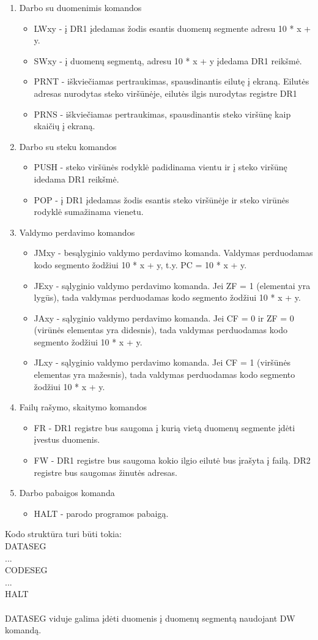 \begin{enumerate}
\begin{itemize}
		\end{itemize}
	\item Darbo su duomenimis komandos
		\begin{itemize}
		\item LWxy - į DR1 įdedamas žodis esantis duomenų segmente adresu 10 * x + y.
		\item SWxy - į duomenų segmentą, adresu 10 * x + y įdedama DR1 reikšmė.
		\item PRNT - iškviečiamas pertraukimas, spausdinantis eilutę į ekraną. Eilutės adresas nurodytas steko viršūnėje, eilutės ilgis nurodytas registre DR1
		\item PRNS - iškviečiamas pertraukimas, spausdinantis steko viršūnę kaip skaičių į ekraną.
		\end{itemize}
	\item Darbo su steku komandos
		\begin{itemize}
		\item PUSH - steko viršūnės rodyklė padidinama vientu ir į steko viršūnę idedama DR1 reikšmė.
		\item POP - į DR1 įdedamas žodis esantis steko viršūnėje ir steko virūnės rodyklė sumažinama vienetu.
		\end{itemize}
	\item Valdymo perdavimo komandos
		\begin{itemize}
		\item JMxy - besąlyginio valdymo perdavimo komanda. Valdymas perduodamas kodo segmento žodžiui 10 * x + y, t.y. PC = 10 * x + y.
		\item JExy - sąlyginio valdymo perdavimo komanda. Jei ZF = 1 (elementai yra lygūs), tada valdymas perduodamas kodo segmento žodžiui 10 * x + y.
		\item JAxy - sąlyginio valdymo perdavimo komanda. Jei CF = 0 ir ZF = 0 (virūnės elementas yra didesnis), tada valdymas perduodamas kodo segmento žodžiui 10 * x + y.
		\item JLxy  - sąlyginio valdymo perdavimo komanda. Jei CF = 1 (viršūnės elementas yra mažesnis), tada valdymas perduodamas kodo segmento žodžiui 10 * x + y.
		\end{itemize}
	\item Failų rašymo, skaitymo komandos
		\begin{itemize}
		\item FR - DR1 registre bus saugoma į kurią vietą duomenų segmente įdėti įvestus duomenis.
		\item FW - DR1 registre bus saugoma kokio ilgio eilutė bus įrašyta į failą. DR2 registre bus saugomas žinutės adresas.
		\end{itemize}
	\item Darbo pabaigos komanda
		\begin{itemize}
		\item HALT - parodo programos pabaigą.
		\end{itemize}
	\end{enumerate}
	Kodo struktūra turi būti tokia:\\
	DATASEG\\
	...\\
	CODESEG\\
	...\\
	HALT\\
	\\
	DATASEG viduje galima įdėti duomenis į duomenų segmentą naudojant DW komandą.
\clearpage